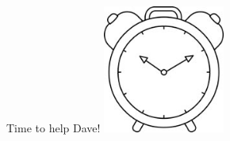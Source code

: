 \begin{frame}{Time to help Dave!}
	\includegraphics[width=0.3\textwidth, center]{Pictures/FirstHalf/alarm}
\end{frame}